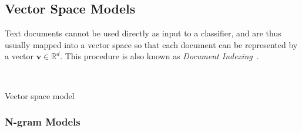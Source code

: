 


\subsection{Vector Space Models}
\label{sub:Vector Space Models}

Text documents cannot be used directly as input to a classifier, and are thus usually mapped into a vector space so that each document can be represented by a vector $\mathbf{v} \in \mathbb{R}^d$. This procedure is also known as \emph{Document Indexing}~\cite{Sebastiani:2002aa}.


~\cite[Chapter 14, p.~289]{Manning:2008aa}

Vector space model~\cite[Chapter 6.3, p.~120]{Manning:2008aa}

\cite[Chapter 6.2, p.~117]{Manning:2008aa}


\subsubsection{N-gram Models}
\label{subs:N-gram Models (Methods)}

